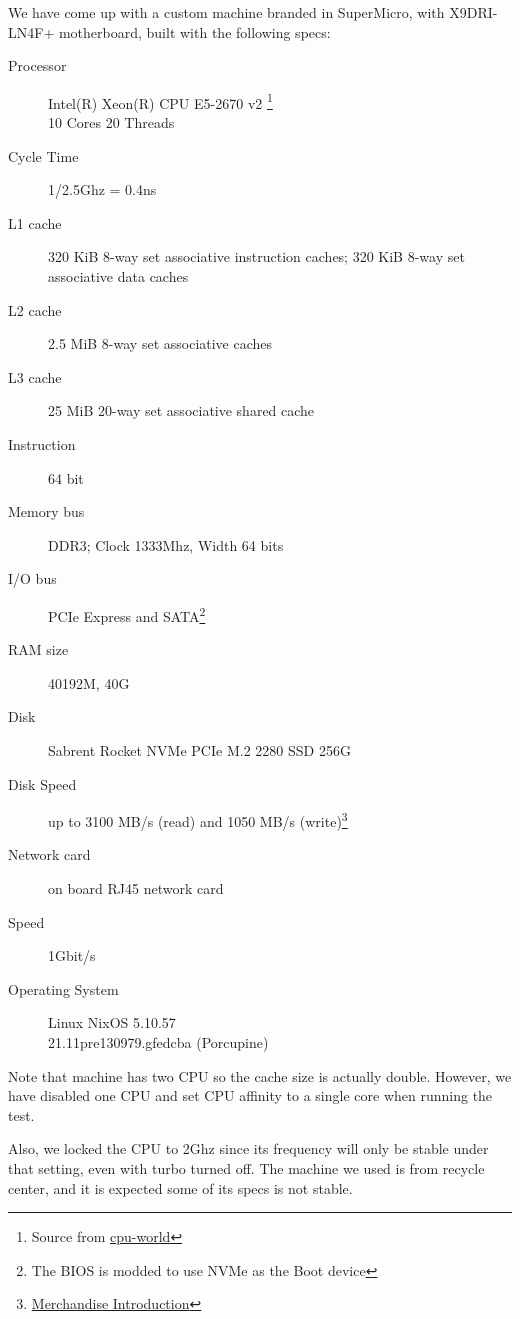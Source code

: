 We have come up with a custom machine branded in SuperMicro, with X9DRI-LN4F+ motherboard, built with the following specs: 
\begin{description}
  
\item[Processor] Intel(R) Xeon(R) CPU E5-2670 v2 \footnote{Source from \href{https://www.cpu-world.com/CPUs/Xeon/Intel-Xeon\%20E5-2670\%20v2.html}{cpu-world}} \\ 10 Cores 20 Threads
\item[Cycle Time] 1/2.5Ghz = 0.4ns
\item[L1 cache] 320 KiB 8-way set associative instruction caches; 320 KiB 8-way set associative data caches
\item[L2 cache] 2.5 MiB 8-way set associative caches
\item[L3 cache] 25 MiB 20-way set associative shared cache
\item [Instruction] 64 bit
\item[Memory bus] DDR3; Clock 1333Mhz, Width 64 bits 
\item[I/O bus] PCIe Express and SATA\footnote{The BIOS is modded to use NVMe as the Boot device}
\item[RAM size] 40192M, 40G
\item[Disk] Sabrent Rocket NVMe PCIe M.2 2280 SSD 256G
\item[Disk Speed] up to 3100 MB/s (read) and 1050 MB/s (write)\footnote{\href{https://www.sabrent.com/product/SB-ROCKET-256/256gb-rocket-nvme-pcie-m-2-2280-internal-ssd-high-performance-solid-state-drive/\#description}{Merchandise Introduction}}
\item[Network card] on board RJ45 network card
\item[Speed] 1Gbit/s
\item[Operating System] Linux NixOS 5.10.57 \\ 21.11pre130979.gfedcba (Porcupine)
\end{description}

\noindent

Note that machine has two CPU so the cache size is actually double. However, we have disabled one CPU and set CPU affinity to a single core when running the test. 

Also, we locked the CPU to 2Ghz since its frequency will only be stable under that setting, even with turbo turned off. The machine we used is from recycle center, and it is expected some of its specs is not stable. 

